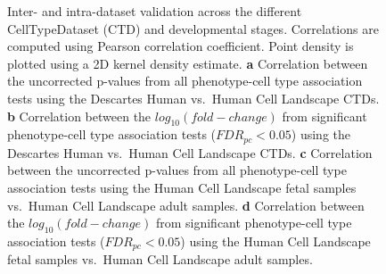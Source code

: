 \documentclass[
]{agujournal2019}
\begin{document}
\label{cell-fig-ctd-correlation}
\begin{figure}[H]


\caption{\label{fig-ctd-correlation}Inter- and intra-dataset validation
across the different CellTypeDataset (CTD) and developmental stages.
Correlations are computed using Pearson correlation coefficient. Point
density is plotted using a 2D kernel density estimate. \textbf{a}
Correlation between the uncorrected p-values from all phenotype-cell
type association tests using the Descartes Human vs.~Human Cell
Landscape CTDs. \textbf{b} Correlation between the
\(log_{10}(fold-change)\) from significant phenotype-cell type
association tests (\(FDR_{pc}<0.05\)) using the Descartes Human
vs.~Human Cell Landscape CTDs. \textbf{c} Correlation between the
uncorrected p-values from all phenotype-cell type association tests
using the Human Cell Landscape fetal samples vs.~Human Cell Landscape
adult samples. \textbf{d} Correlation between the
\(log_{10}(fold-change)\) from significant phenotype-cell type
association tests (\(FDR_{pc}<0.05\)) using the Human Cell Landscape
fetal samples vs.~Human Cell Landscape adult samples.}

\end{figure}%
\end{document}
